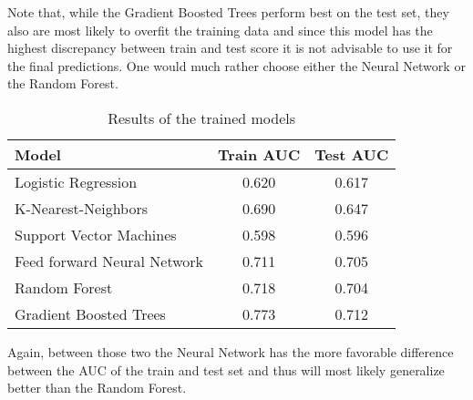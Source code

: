 Note that, while the Gradient Boosted Trees perform best on the test set, they also are most likely to overfit the training data and since this model has the highest discrepancy between train and test score it is not advisable to use it for  the final predictions. One would much rather choose either the Neural Network or the Random Forest. 

\begin{wraptable}[8]{r}{7.5cm}
\centering
\caption{Results of the trained models}
\tiny
\begin{tabular}{lcc}
\toprule
Model                       & Train AUC & Test AUC \\
\midrule
Logistic Regression         & 0.620     & 0.617    \\
K-Nearest-Neighbors         & 0.690     & 0.647    \\
Support Vector Machines     & 0.598     & 0.596    \\
Feed forward Neural Network & 0.711     & 0.705    \\
Random Forest               & 0.718     & 0.704    \\
Gradient Boosted Trees      & 0.773     & 0.712    \\
\bottomrule  
\end{tabular}
\end{wraptable}


Again, between those two the Neural Network has the more favorable difference between the AUC of the train and test set and thus will most likely generalize better 
than the Random Forest.
